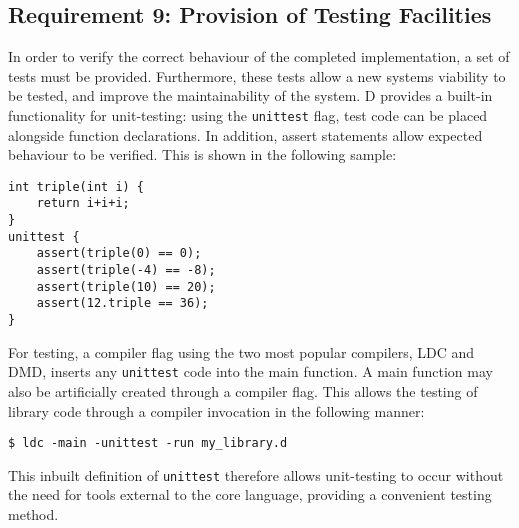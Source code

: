\subsection{Requirement 9: Provision of Testing Facilities}
In order to verify the correct behaviour of the completed implementation, a set 
of tests must be provided. Furthermore, these tests allow a new systems viability 
to be tested, and improve the maintainability of the system. D provides a built-in 
functionality for unit-testing: using the \texttt{unittest} flag, test code can 
be placed alongside function declarations. In addition, assert statements allow 
expected behaviour to be verified. 
This is shown in the following sample:
\begin{lstlisting}
int triple(int i) {
    return i+i+i; 
}
unittest {
    assert(triple(0) == 0); 
    assert(triple(-4) == -8); 
    assert(triple(10) == 20); 
    assert(12.triple == 36);
}
\end{lstlisting}
For testing, a compiler flag using the two most popular compilers, LDC and DMD, 
inserts any \texttt{unittest} code into the main function. A main function may 
also be artificially created through a compiler flag. This allows the testing of 
library code through a compiler invocation in the following manner: 
\begin{lstlisting}
$ ldc -main -unittest -run my_library.d
\end{lstlisting}
This inbuilt definition of \texttt{unittest} therefore allows unit-testing to occur 
without the need for tools external to the core language, providing a convenient 
testing method. 
